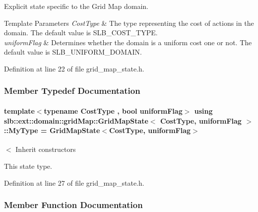 Explicit state specific to the Grid Map domain. 


\begin{DoxyTemplParams}{Template Parameters}
{\em Cost\+Type} & The type representing the cost of actions in the domain. The default value is {\ttfamily S\+L\+B\+\_\+\+C\+O\+S\+T\+\_\+\+T\+Y\+PE}. \\
\hline
{\em uniform\+Flag} & Determines whether the domain is a uniform cost one or not. The default value is {\ttfamily S\+L\+B\+\_\+\+U\+N\+I\+F\+O\+R\+M\+\_\+\+D\+O\+M\+A\+IN}. \\
\hline
\end{DoxyTemplParams}


Definition at line 22 of file grid\+\_\+map\+\_\+state.\+h.



\subsubsection{Member Typedef Documentation}
\paragraph[{\texorpdfstring{My\+Type}{MyType}}]{\setlength{\rightskip}{0pt plus 5cm}template$<$typename Cost\+Type , bool uniform\+Flag$>$ using {\bf slb\+::ext\+::domain\+::grid\+Map\+::\+Grid\+Map\+State}$<$ {\bf Cost\+Type}, uniform\+Flag $>$\+::{\bf My\+Type} =  {\bf Grid\+Map\+State}$<${\bf Cost\+Type}, uniform\+Flag$>$}\hypertarget{structslb_1_1ext_1_1domain_1_1gridMap_1_1GridMapState_a5670f2d1eab2ffb4953cd947e159d78a}{}\label{structslb_1_1ext_1_1domain_1_1gridMap_1_1GridMapState_a5670f2d1eab2ffb4953cd947e159d78a}


$<$ Inherit constructors 

This state type. 

Definition at line 27 of file grid\+\_\+map\+\_\+state.\+h.



\subsubsection{Member Function Documentation}
